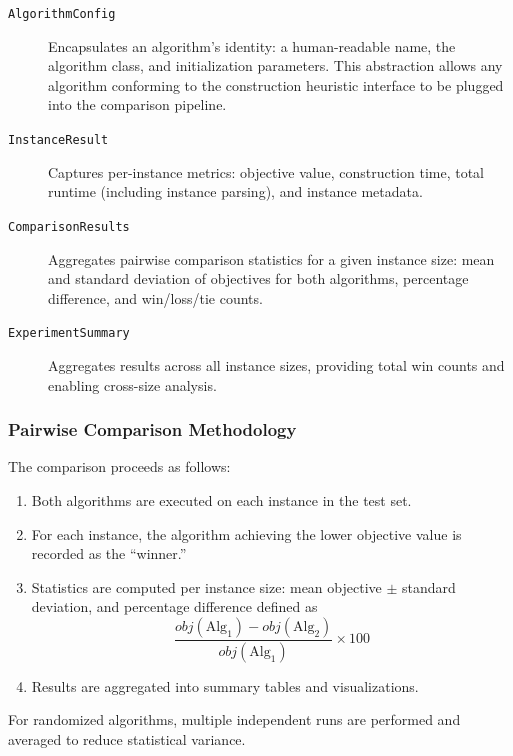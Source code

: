 \documentclass[a4paper]{scrartcl}
\begin{document}
\begin{description}
  \item[\texttt{AlgorithmConfig}] Encapsulates an algorithm's identity: a human-readable name, the algorithm class, and initialization parameters. This abstraction allows any algorithm conforming to the construction heuristic interface to be plugged into the comparison pipeline.

  \item[\texttt{InstanceResult}] Captures per-instance metrics: objective value, construction time, total runtime (including instance parsing), and instance metadata.

  \item[\texttt{ComparisonResults}] Aggregates pairwise comparison statistics for a given instance size: mean and standard deviation of objectives for both algorithms, percentage difference, and win/loss/tie counts.

  \item[\texttt{ExperimentSummary}] Aggregates results across all instance sizes, providing total win counts and enabling cross-size analysis.
\end{description}

\subsubsection{Pairwise Comparison Methodology}\label{algos_comparison}
The comparison proceeds as follows:
\begin{enumerate}
  \item Both algorithms are executed on each instance in the test set.
  \item For each instance, the algorithm achieving the lower objective value is recorded as the ``winner.''
  \item Statistics are computed per instance size: mean objective $\pm$ standard deviation, and percentage difference defined as \[\frac{obj(\text{Alg}_1) - obj(\text{Alg}_2)}{obj(\text{Alg}_1)} \times 100\]
  \item Results are aggregated into summary tables and visualizations.
\end{enumerate}

For randomized algorithms, multiple independent runs are performed and averaged to reduce statistical variance.
\end{document}
